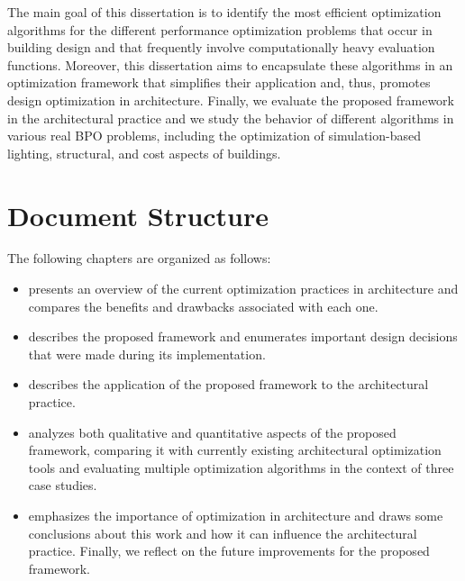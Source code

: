 The main goal of this dissertation is to identify the most efficient optimization algorithms for the different performance optimization problems that occur in building design and that frequently involve computationally heavy evaluation functions. Moreover, this dissertation aims to encapsulate these algorithms in an optimization framework that simplifies their application and, thus, promotes design optimization in architecture. Finally, we evaluate the proposed framework in the architectural practice and we study the behavior of different algorithms in various real \ac{BPO} problems, including the optimization of simulation-based lighting, structural, and cost aspects of buildings. 

\section{Document Structure}
The following chapters are organized as follows:
\begin{itemize}
\item \textbf{} presents an overview of the current optimization practices in architecture and compares the benefits and drawbacks associated with each one.  
\item \textbf{} describes the proposed framework and enumerates important design decisions that were made during its implementation. 
\item \textbf{} describes the application of the proposed framework to the architectural practice. 
\item \textbf{} analyzes both qualitative and quantitative aspects of the proposed framework, comparing it with currently existing architectural optimization tools and evaluating multiple optimization algorithms in the context of three case studies.
\item \textbf{} emphasizes the importance of optimization in architecture and draws some conclusions about this work and how it can influence the architectural practice. Finally, we reflect on the future improvements for the proposed framework.
\end{itemize}

